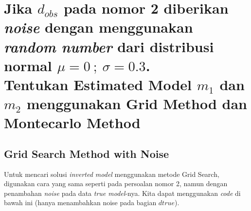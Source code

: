 \documentclass{article}
\begin{document}
\section{Jika $d_{obs}$ pada nomor 2 diberikan \textit{noise} dengan menggunakan \textit{random number} dari distribusi normal $\mu=0 \ ; \ \sigma=0.3$. \\
Tentukan Estimated Model $m_1$ dan $m_2$ menggunakan Grid Method dan Montecarlo Method}
\subsection{Grid Search Method with Noise}
Untuk mencari solusi \textit{inverted model} menggunakan metode Grid Search, digunakan cara yang sama seperti pada persoalan nomor 2, namun dengan penambahan \textit{noise} pada data \textit{true model}-nya. Kita dapat menggunakan \textit{code} di bawah ini (hanya menambahkan noise pada bagian $dtrue$).
\end{document}

